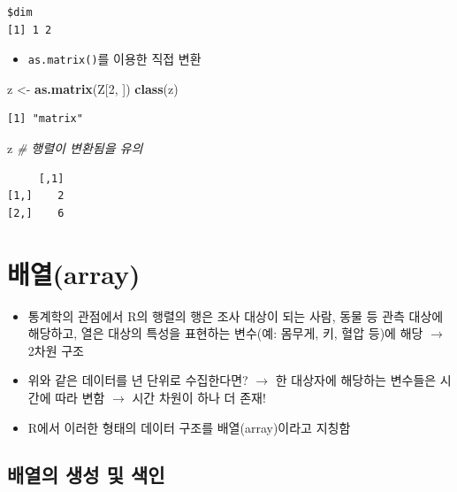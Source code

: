 \documentclass[
  11pt,
]{krantz}
\newenvironment{Shaded}{\begin{snugshade}}{\end{snugshade}}
\newcommand{\CommentTok}[1]{\textcolor[rgb]{0.37,0.37,0.37}{\textit{#1}}}
\newcommand{\DecValTok}[1]{\textcolor[rgb]{0.06,0.06,0.06}{#1}}
\newcommand{\KeywordTok}[1]{\textcolor[rgb]{0.27,0.27,0.27}{\textbf{#1}}}
\newcommand{\NormalTok}[1]{#1}
\newcommand{\StringTok}[1]{\textcolor[rgb]{0.5,0.5,0.5}{#1}}
\providecommand{\tightlist}{%
  \setlength{\itemsep}{0pt}\setlength{\parskip}{0pt}}
\begin{document}
\begin{verbatim}
$dim
[1] 1 2
\end{verbatim}

\normalsize

\begin{itemize}
\tightlist
\item
  \texttt{as.matrix()}를 이용한 직접 변환
\end{itemize}

\footnotesize

\begin{Shaded}
\begin{Highlighting}[]
\NormalTok{z <-}\StringTok{ }\KeywordTok{as.matrix}\NormalTok{(Z[}\DecValTok{2}\NormalTok{, ])}
\KeywordTok{class}\NormalTok{(z)}
\end{Highlighting}
\end{Shaded}

\begin{verbatim}
[1] "matrix"
\end{verbatim}

\begin{Shaded}
\begin{Highlighting}[]
\NormalTok{z }\CommentTok{# 행렬이 변환됨을 유의}
\end{Highlighting}
\end{Shaded}

\begin{verbatim}
     [,1]
[1,]    2
[2,]    6
\end{verbatim}

\normalsize

\hypertarget{array}{%
\section{배열(array)}\label{array}}

\begin{itemize}
\tightlist
\item
  통계학의 관점에서 R의 행렬의 행은 조사 대상이 되는 사람, 동물 등 관측 대상에 해당하고, 열은 대상의 특성을 표현하는 변수(예: 몸무게, 키, 혈압 등)에 해당 \(\rightarrow\) 2차원 구조
\item
  위와 같은 데이터를 년 단위로 수집한다면? \(\rightarrow\) 한 대상자에 해당하는 변수들은 시간에 따라 변함 \(\rightarrow\) 시간 차원이 하나 더 존재!
\item
  R에서 이러한 형태의 데이터 구조를 배열(array)이라고 지칭함
\end{itemize}

\hypertarget{make-array}{%
\subsection{배열의 생성 및 색인}\label{make-array}}
\end{document}
